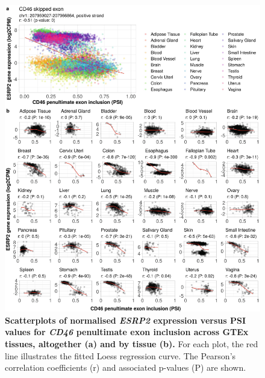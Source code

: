 \begin{figure}[!p]
  \includegraphics[width=1\textwidth]{images/psichomics/8-gtex-cor}
  \centering
  \caption[\emph{ESRP2} expression versus \emph{CD46} penultimate exon PSI across GTEx tissues]{\textbf{Scatterplots of normalised \emph{ESRP2} expression versus PSI values for \emph{CD46} penultimate exon inclusion across GTEx tissues, altogether (a) and by tissue (b).} For each plot, the red line illustrates the fitted Loess regression curve. The Pearson’s correlation coefficients (r) and associated p-values (P) are shown.}
  \label{fig:psichomics-gtex-cor}
\end{figure}

